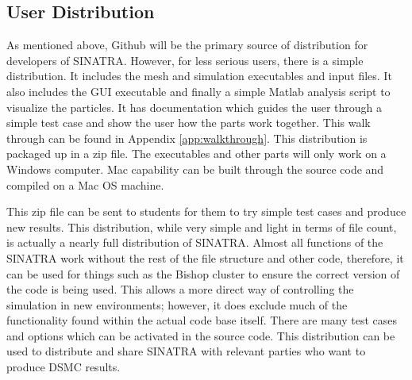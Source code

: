 \subsection{User Distribution}

As mentioned above, Github will be the primary source of distribution for developers of SINATRA. However, for less serious users, there is a simple distribution. It includes the mesh and simulation executables and input files. It also includes the GUI executable and finally a simple Matlab analysis script to visualize the particles. It has documentation which guides the user through a simple test case and show the user how the parts work together. This walk through can be found in Appendix \ref{app:walkthrough}. This distribution is packaged up in a zip file. The executables and other parts will only work on a Windows computer. Mac capability can be built through the source code and compiled on a Mac OS machine. \par

\indent This zip file can be sent to students for them to try simple test cases and produce new results. This distribution, while very simple and light in terms of file count, is actually a nearly full distribution of SINATRA. Almost all functions of the SINATRA work without the rest of the file structure and other code, therefore, it can be used for things such as the Bishop cluster to ensure the correct version of the code is being used. This allows a more direct way of controlling the simulation in new environments; however, it does exclude much of the functionality found within the actual code base itself. There are many test cases and options which can be activated in the source code. This distribution can be used to distribute and share SINATRA with relevant parties who want to produce DSMC results.

